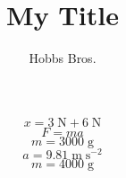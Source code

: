 \documentclass[12pt]{article}
\begin{document}
\title{My Title}
\author{Hobbs Bros.}
$$
x = 3 \; \mathrm{N} + 6 \; \mathrm{N}
$$
$$
F = m a
$$
$$
m = 3000 \; \mathrm{g}
$$
$$
a = 9.81 \; \mathrm{m} \; \mathrm{s^{-2}}
$$
$$
m = 4000 \; \mathrm{g}
$$
\end{document}
